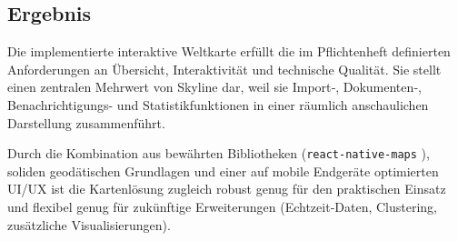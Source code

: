 \subsection{Ergebnis}

Die implementierte interaktive Weltkarte erfüllt die im Pflichtenheft definierten Anforderungen an Übersicht, Interaktivität und technische Qualität.
Sie stellt einen zentralen Mehrwert von Skyline dar, weil sie Import‑, Dokumenten‑, Benachrichtigungs- und Statistikfunktionen in einer räumlich anschaulichen Darstellung zusammenführt.

Durch die Kombination aus bewährten Bibliotheken (\texttt{react-native-maps} \cite{reactNativeMaps}), soliden geodätischen Grundlagen \cite{movableTypeLatLong} und einer auf mobile Endgeräte optimierten UI/UX ist die Kartenlösung zugleich robust genug für den praktischen Einsatz und flexibel genug für zukünftige Erweiterungen (Echtzeit‑Daten, Clustering, zusätzliche Visualisierungen).
